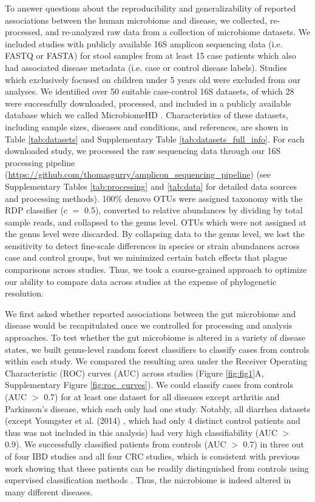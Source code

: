 To answer questions about the reproducibility and generalizability of reported associations between the human microbiome and disease, we collected, re-processed, and re-analyzed raw data from a collection of microbiome datasets.
We included studies with publicly available 16S amplicon sequencing data (i.e. FASTQ or FASTA) for stool samples from at least 15 case patients which also had associated disease metadata (i.e. case or control disease labels).
Studies which exclusively focused on children under 5 years old were excluded from our analyses.
We identified over 50 suitable case-control 16S datasets, of which 28 were successfully downloaded, processed, and included in a publicly available database which we called MicrobiomeHD \cite{microbiomehd}.
Characteristics of these datasets, including sample sizes, diseases and conditions, and references, are shown in Table \ref{tab:datasets} and Supplementary Table \ref{tab:datasets_full_info}.
For each downloaded study, we processed the raw sequencing data through our 16S processing pipeline (\url{https://github.com/thomasgurry/amplicon_sequencing_pipeline}) (see Supplementary Tables \ref{tab:processing} and \ref{tab:data} for detailed data sources and processing methods).
100\% denovo OTUs were assigned taxonomy with the RDP classifier \cite{wang2007naive} (c $=$ 0.5), converted to relative abundances by dividing by total sample reads, and collapsed to the genus level. OTUs which were not assigned at the genus level were discarded.
By collapsing data to the genus level, we lost the sensitivity to detect fine-scale differences in species or strain abundances across case and control groups, but we minimized certain batch effects that plague comparisons across studies.
Thus, we took a course-grained approach to optimize our ability to compare data across studies at the expense of phylogenetic resolution.

We first asked whether reported associations between the gut microbiome and disease would be recapitulated once we controlled for processing and analysis approaches.
To test whether the gut microbiome is altered in a variety of disease states, we built genus-level random forest classifiers to classify cases from controls within each study.
We compared the resulting area under the Receiver Operating Characteristic (ROC) curves (AUC) across studies (Figure \ref{fig:fig1}A, Supplementary Figure \ref{fig:roc_curves}).
We could classify cases from controls (AUC $>$ 0.7) for at least one dataset for all diseases except arthritis and Parkinson's disease, which each only had one study.
Notably, all diarrhea datasets (except Youngster et al. (2014) \cite{cdi-youngster}, which had only 4 distinct control patients and thus was not included in this analysis) had very high classifiability (AUC $>$ 0.9).
We successfully classified patients from controls (AUC $>$ 0.7) in three out of four IBD studies and all four CRC studies, which is consistent with previous work showing that these patients can be readily distinguished from controls using supervised classification methods \cite{walters2014meta,ibd-papa,crc-baxter,crc-zeller}.
Thus, the microbiome is indeed altered in many different diseases.

